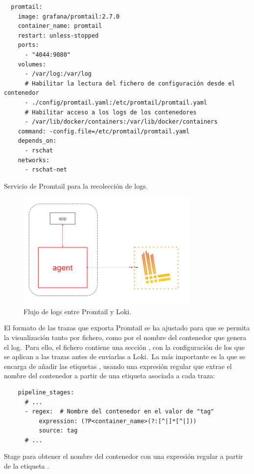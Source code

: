 \begin{codeBlock}
	\begin{verbatim}
  promtail:
    image: grafana/promtail:2.7.0
    container_name: promtail
    restart: unless-stopped
    ports:
      - "4044:9080"
    volumes:
      - /var/log:/var/log
      # Habilitar la lectura del fichero de configuración desde el contenedor
      - ./config/promtail.yaml:/etc/promtail/promtail.yaml
      # Habilitar acceso a los logs de los contenedores
      - /var/lib/docker/containers:/var/lib/docker/containers
    command: -config.file=/etc/promtail/promtail.yaml
    depends_on:
      - rschat
    networks:
      - rschat-net
	\end{verbatim}
	\caption{Servicio de Promtail para la recolección de logs.}
	\label{cod:promtail-docker-compose}
\end{codeBlock}

\begin{figure}[ht]
	\centering
	\includegraphics[width=0.8\textwidth]{res/images/loki-promtail-architecture}
	\caption{Flujo de logs entre Promtail y Loki.}
	\label{fig:promtail}
\end{figure}

El formato de las trazas que exporta Promtail se ha ajustado para que se permita la visualización tanto por fichero,
como por el nombre del contenedor que genera el log.\ Para ello, el fichero 
contiene una sección , con la configuración de los  que se aplican a las
trazas antes de enviarlas a Loki.\ La más importante es la que se encarga de añadir las etiquetas
, usando una expresión regular que extrae el nombre del contenedor a partir de una etiqueta
asociada a cada traza:

\begin{codeBlock}
	\begin{verbatim}
    pipeline_stages:
      # ...
      - regex:  # Nombre del contenedor en el valor de "tag"
          expression: (?P<container_name>(?:[^|]*[^|]))
          source: tag
      # ...
	\end{verbatim}
	\caption{Stage para obtener el nombre del contenedor con una expresión regular a partir de la etiqueta
	.}
	\label{cod:promtail-regexp-container-name}
\end{codeBlock}

